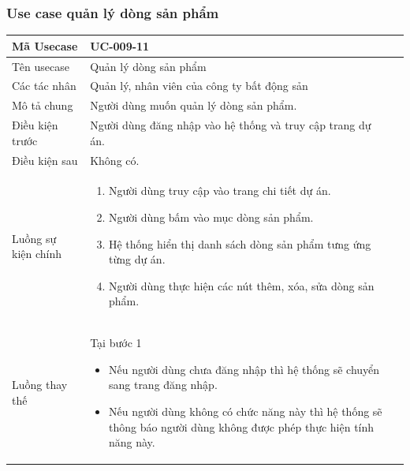 \documentclass[12pt,a4paper]{article}
\begin{document}
\begin{table}[H]
    \end{table}


    \subsubsection*{Use case quản lý dòng sản phẩm}
    \begin{table}[H]
        \centering
        \begin{tabular}{|p{3.5cm}|p{11.5cm}|c|}
            \hline
            Mã Usecase      & UC-009-11                                                  \\
            \hline
            Tên usecase     & Quản lý dòng sản phẩm                                      \\
            \hline
            Các tác nhân    & Quản lý, nhân viên của công ty bất động sản                \\
            \hline
            Mô tả chung     & Người dùng muốn quản lý dòng sản phẩm.                     \\
            \hline

            Điều kiện trước & Người dùng đăng nhập vào hệ thống và truy cập trang dự án. \\
            \hline

            Điều kiện sau   & Không có.                                                  \\
            \hline

            Luồng sự kiện chính & \vspace{-.8cm}\begin{enumerate}
                                                    \item Người dùng truy cập vào trang chi tiết dự án.
                                                    \item Người dùng bấm vào mục dòng sản phẩm.
                                                    \item Hệ thống hiển thị danh sách dòng sản phẩm tưng ứng từng dự án.
                                                    \item Người dùng thực hiện các nút thêm, xóa, sửa dòng sản phẩm.
            \end{enumerate}
            \\
            \hline
            Luồng thay thế & Tại bước 1\newline
            \vspace{-.8cm}\begin{itemize}
                              \item Nếu người dùng chưa đăng nhập thì hệ thống sẽ chuyển sang trang đăng nhập.
                              \item Nếu người dùng không có chức năng này thì hệ thống sẽ thông báo người dùng không được phép thực hiện tính năng này.
            \end{itemize}


\end{tabular}
\end{table}
\end{document}
